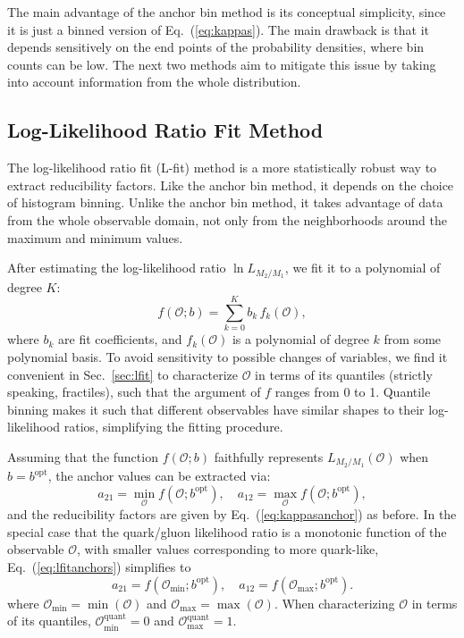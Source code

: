 \documentclass[aps,prd,twocolumn,preprintnumbers,nofootinbib,longbibliography,floatfix]{revtex4-1}
\DeclareRobustCommand{\Sec}[1]{Sec.~\ref{#1}}
\DeclareRobustCommand{\Eq}[1]{Eq.~(\ref{#1})}
\newcommand{\figO}{\mathcal{O}}
\begin{document}
The main advantage of the anchor bin method is its conceptual simplicity, since it is just a binned version of \Eq{eq:kappas}.
%
The main drawback is that it depends sensitively on the end points of the probability densities, where bin counts can be low.
%
The next two methods aim to mitigate this issue by taking into account information from the whole distribution.



\subsection{Log-Likelihood Ratio Fit Method}
\label{subsection:l-fit}

The log-likelihood ratio fit (L-fit) method is a more statistically robust way to extract reducibility factors.
%
Like the anchor bin method, it depends on the choice of histogram binning.
%
Unlike the anchor bin method, it takes advantage of data from the whole observable domain, not only from the neighborhoods around the maximum and minimum values.



After estimating the log-likelihood ratio $\ln L_{M_2/M_1}$, we fit it to a polynomial of degree $K$:
%
\begin{equation} \label{eq:lfit_fit_form}
	f(\figO; b) = \sum_{k = 0}^{K} b_k \, f_k(\figO),
\end{equation}
%
where $b_k$ are fit coefficients, and $f_k(\figO)$ is a polynomial of degree $k$ from some polynomial basis.
%
To avoid sensitivity to possible changes of variables, we find it convenient in \Sec{sec:lfit} to characterize $\figO$ in terms of its quantiles (strictly speaking, fractiles), such that the argument of $f$ ranges from 0 to 1.
%
Quantile binning makes it such that different observables have similar shapes to their log-likelihood ratios, simplifying the fitting procedure.


Assuming that the function $f(\figO; b)$ faithfully represents $L_{M_2/M_1}(\figO)$ when $b = b^\text{opt}$, the anchor values can be extracted via:
%
\begin{equation}
\label{eq:lfitanchors}
a_{21} = \min_\figO f(\figO; b^\text{opt}), \quad a_{12} = \max_\figO f(\figO; b^\text{opt}), 
\end{equation}
%
and the reducibility factors are given by \Eq{eq:kappasanchor} as before.
%
In the special case that the quark/gluon likelihood ratio is a monotonic function of the observable $\figO$, with smaller values corresponding to more quark-like, \Eq{eq:lfitanchors} simplifies to
%
\begin{equation}
\label{eq:lfitanchors2}
a_{21} = f(\figO_\text{min}; b^\text{opt}), \quad a_{12} = f(\figO_\text{max}; b^\text{opt}).
\end{equation}
%
where $\figO_\text{min} = \min (\figO)$ and $\figO_\text{max} = \max (\figO)$.
%
When characterizing $\figO$ in terms of its quantiles, $\figO^\text{quant}_\text{min} = 0$ and $\figO^\text{quant}_\text{max} = 1$.
\end{document}
